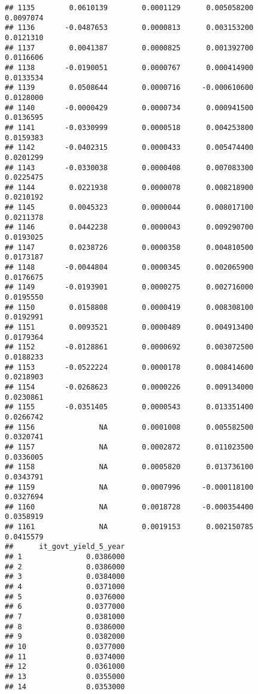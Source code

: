 \documentclass[
]{article}
\begin{document}
\begin{verbatim}
## 1135        0.0610139        0.0001129      0.005058200             0.0097074
## 1136       -0.0487653        0.0000813      0.003153200             0.0121310
## 1137        0.0041387        0.0000825      0.001392700             0.0116606
## 1138       -0.0190051        0.0000767      0.000414900             0.0133534
## 1139        0.0508644        0.0000716     -0.000610600             0.0128000
## 1140       -0.0000429        0.0000734      0.000941500             0.0136595
## 1141       -0.0330999        0.0000518      0.004253800             0.0159383
## 1142       -0.0402315        0.0000433      0.005474400             0.0201299
## 1143       -0.0330038        0.0000408      0.007083300             0.0225475
## 1144        0.0221938        0.0000078      0.008218900             0.0210192
## 1145        0.0045323        0.0000044      0.008017100             0.0211378
## 1146        0.0442238        0.0000043      0.009290700             0.0193025
## 1147        0.0238726        0.0000358      0.004810500             0.0173187
## 1148       -0.0044804        0.0000345      0.002065900             0.0176675
## 1149       -0.0193901        0.0000275      0.002716000             0.0195550
## 1150        0.0158808        0.0000419      0.008308100             0.0192991
## 1151        0.0093521        0.0000489      0.004913400             0.0179364
## 1152       -0.0128861        0.0000692      0.003072500             0.0188233
## 1153       -0.0522224        0.0000178      0.008414600             0.0218903
## 1154       -0.0268623        0.0000226      0.009134000             0.0230861
## 1155       -0.0351405        0.0000543      0.013351400             0.0266742
## 1156               NA        0.0001008      0.005582500             0.0320741
## 1157               NA        0.0002872      0.011023500             0.0336005
## 1158               NA        0.0005820      0.013736100             0.0343791
## 1159               NA        0.0007996     -0.000118100             0.0327694
## 1160               NA        0.0018728     -0.000354400             0.0358919
## 1161               NA        0.0019153      0.002150785             0.0415579
##      it_govt_yield_5_year
## 1               0.0386000
## 2               0.0386000
## 3               0.0384000
## 4               0.0371000
## 5               0.0376000
## 6               0.0377000
## 7               0.0381000
## 8               0.0386000
## 9               0.0382000
## 10              0.0377000
## 11              0.0374000
## 12              0.0361000
## 13              0.0355000
## 14              0.0353000

\end{verbatim}
\end{document}
